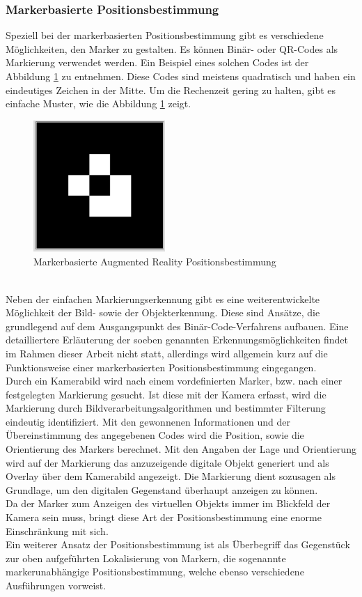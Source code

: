 \subsubsection*{Markerbasierte Positionsbestimmung}
Speziell bei der markerbasierten Positionsbestimmung gibt es verschiedene Möglichkeiten, den Marker zu gestalten. Es können 
Binär- oder QR-Codes als Markierung verwendet werden. Ein Beispiel eines solchen Codes ist der Abbildung \ref{pic:markerARpos} zu entnehmen. 
Diese Codes sind meistens quadratisch und haben ein eindeutiges Zeichen in der Mitte. Um die Rechenzeit gering zu halten, gibt es einfache Muster, 
wie die Abbildung \ref{pic:markerARpos} zeigt. \cite{arTracking.2019o}
\begin{figure}[hbt!]
    \centering
    \includegraphics[width=5cm,height=5cm,keepaspectratio]{2Grundlagen/Bilder/bildmarkerAR.png}
    \caption{Markerbasierte Augmented Reality Positionsbestimmung}
    \label{pic:markerARpos}
\end{figure}
\\ 
Neben der einfachen Markierungserkennung gibt es eine weiterentwickelte Möglichkeit der Bild- sowie der Objekterkennung. Diese sind Ansätze, 
die grundlegend auf dem Ausgangspunkt des Binär-Code-Verfahrens aufbauen. \cite{googleaugmImage.2020m} Eine detailliertere Erläuterung der soeben genannten 
Erkennungsmöglichkeiten findet im Rahmen dieser Arbeit nicht statt, allerdings wird allgemein kurz auf die Funktionsweise einer 
markerbasierten Positionsbestimmung eingegangen.
\\ 
Durch ein Kamerabild wird nach einem vordefinierten Marker, bzw. nach einer festgelegten Markierung gesucht. Ist diese mit der Kamera erfasst, 
wird die Markierung durch Bildverarbeitungsalgorithmen und bestimmter Filterung eindeutig identifiziert. Mit den gewonnenen Informationen und 
der Übereinstimmung des angegebenen Codes wird die Position, sowie die Orientierung des Markers berechnet. Mit den Angaben der Lage und 
Orientierung wird auf der Markierung das anzuzeigende digitale Objekt generiert und als Overlay über dem Kamerabild angezeigt. Die Markierung 
dient sozusagen als Grundlage, um den digitalen Gegenstand überhaupt anzeigen zu können.
\\ 
Da der Marker zum Anzeigen des virtuellen Objekts immer im Blickfeld der Kamera sein muss, bringt diese Art der Positionsbestimmung eine 
enorme Einschränkung mit sich. 
\\ 
\linebreak
Ein weiterer Ansatz der Positionsbestimmung ist als Überbegriff das Gegenstück zur oben aufgeführten Lokalisierung von Markern, die 
sogenannte markerunabhängige Positionsbestimmung, welche ebenso verschiedene Ausführungen vorweist. 
